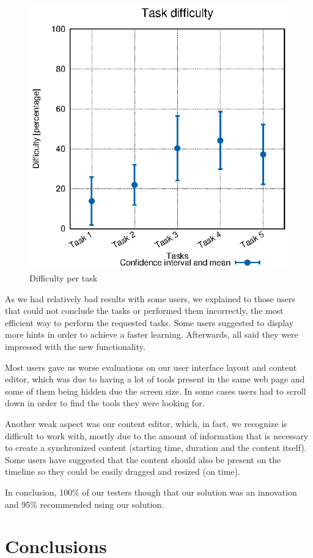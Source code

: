\documentclass[10pt,conference]{IEEEtran}
\begin{document}
\begin{figure}
  \centering
    \includegraphics[width=0.75\linewidth]{stats/user_diffs.eps}
  \caption{Difficulty per task}
  \label{fig:user_diffs}
\end{figure}


As we had relatively bad results with some users, we explained to those users that could not conclude the tasks or performed them incorrectly, the most efficient way to perform the requested tasks.
Some users suggested to display more hints in order to achieve a faster learning.
Afterwards, all said they were impressed with the new functionality.

Most users gave us worse evaluations on our user interface layout and content editor, which was due to having a lot of tools present in the same web page and some of them being hidden due the screen size.
In some cases users had to scroll down in order to find the tools they were looking for. 

Another weak aspect was our content editor, which, in fact, we recognize is difficult to work with, mostly due to the amount of information that is necessary to create a synchronized content (starting time, duration and the content itself).
Some users have suggested that the content should also be present on the timeline so they could be easily dragged and resized (on time).

In conclusion, 100\% of our testers though that our solution was an innovation and 95\% recommended using our solution.




\section{Conclusions}
\label{chapter:conclusion}
\end{document}
